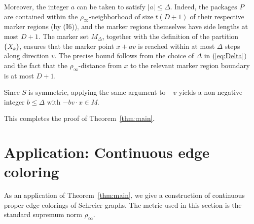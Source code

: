 \documentclass[10pt,a4paper]{amsart}
\begin{document}
Moreover, the integer $a$ can be taken to satisfy $|a|\leq \Delta$.
Indeed, the packages $P$ are contained within the $\rho_\infty$-neighborhood
of size $t(D+1)$ of their respective marker regions (by (I6)), and the
marker regions themselves have side lengths at most $D+1$. The marker set
$M_\Delta$, together with the definition of the partition $\{X_k\}$,
ensures that the marker point $x+av$ is reached within at most $\Delta$
steps along direction $v$. The precise bound follows from the choice of
$\Delta$ in (\ref{eq:Delta}) and the fact that the $\rho_\infty$-distance
from $x$ to the relevant marker region boundary is at most $D+1$.

Since $S$ is symmetric, applying the same argument to $-v$ yields a
non-negative integer $b\leq\Delta$ with $-bv\cdot x\in M$.

This completes the proof of Theorem~\ref{thm:main}.

\section{Application: Continuous edge coloring}\label{sec:app}

As an application of Theorem~\ref{thm:main}, we give a construction of
continuous proper edge colorings of Schreier graphs. The metric used in
this section is the standard supremum norm $\rho_\infty$.
\end{document}
